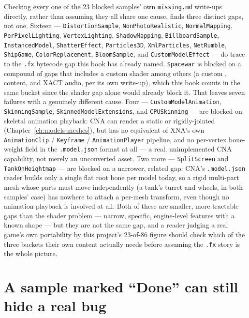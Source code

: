 Checking every one of the 23 blocked samples' own \texttt{missing.md} write-ups directly,
rather than assuming they all share one cause, finds three distinct gaps, not one. Sixteen ---
\texttt{DistortionSample}, \texttt{NonPhotoRealistic}, \texttt{NormalMapping},
\texttt{PerPixelLighting}, \texttt{VertexLighting}, \texttt{ShadowMapping},
\texttt{BillboardSample}, \texttt{InstancedModel}, \texttt{ShatterEffect},
\texttt{Particles3D}, \texttt{XmlParticles}, \texttt{NetRumble}, \texttt{ShipGame},
\texttt{ColorReplacement}, \texttt{BloomSample}, and \texttt{CustomModelEffect} --- do trace to
the \texttt{.fx} bytecode gap this book has already named. \texttt{Spacewar} is blocked on a
compound of gaps that includes a custom shader among others (a custom ,
 content, and XACT audio, per its own write-up), which this book counts
in the same bucket since the shader gap alone would already block it. That leaves seven
failures with a genuinely different cause. Four --- \texttt{CustomModelAnimation},
\texttt{SkinningSample}, \texttt{SkinnedModelExtensions}, and \texttt{CPUSkinning} --- are
blocked on skeletal animation playback: CNA can render a static or rigidly-jointed
 (Chapter~\ref{ch:models-meshes}), but has no equivalent of XNA's own
\texttt{AnimationClip} / \texttt{Keyframe} / \texttt{AnimationPlayer} pipeline, and no per-vertex
bone-weight field in the \texttt{.model.json} format at all --- a real, unimplemented CNA
capability, not merely an unconverted asset. Two more --- \texttt{SplitScreen} and
\texttt{TankOnHeightmap} --- are blocked on a narrower, related gap: CNA's \texttt{.model.json}
reader builds only a single flat root bone per model today, so a rigid multi-part mesh whose
parts must move independently (a tank's turret and wheels, in both samples' case) has nowhere
to attach a per-mesh transform, even though no animation playback is involved at all. Both of
these are smaller, more tractable gaps than the shader problem --- narrow, specific, engine-level
features with a known shape --- but they are not the same gap, and a reader judging a real
game's own portability by this project's 23-of-86 figure should check which of the three
buckets their own content actually needs before assuming the \texttt{.fx} story is the whole
picture.

\section{A sample marked ``Done'' can still hide a real bug}

